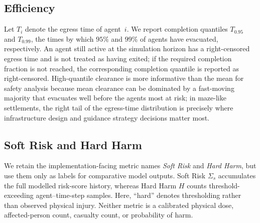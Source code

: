 \documentclass[preprint,12pt]{elsarticle}
\providecommand{\FloatBarrier}{}
\let\origsubsection\subsection
\renewcommand{\subsection}{\FloatBarrier\origsubsection}
\begin{document}
\subsection{Efficiency}
\label{sec:eval_efficiency}

Let $T_i$ denote the egress time of agent~$i$. We report completion
quantiles $T_{0.95}$ and $T_{0.99}$, the times by which $95\%$ and
$99\%$ of agents have evacuated, respectively. An agent still active at
the simulation horizon has a right-censored egress time and is not treated
as having exited; if the required completion fraction is not reached, the
corresponding completion quantile is reported as right-censored. High-quantile clearance is
more informative than the mean for safety analysis because mean
clearance can be dominated by a fast-moving majority that evacuates
well before the agents most at risk; in maze-like settlements, the
right tail of the egress-time distribution is precisely where
infrastructure design and guidance strategy decisions matter most.


\subsection{Soft Risk and Hard Harm}
\label{sec:eval_exposure}

We retain the implementation-facing metric names \emph{Soft Risk} and
\emph{Hard Harm}, but use them only as labels for comparative model
outputs. Soft Risk $\Sigma_s$ accumulates the full modelled risk-score
history, whereas Hard Harm $H$ counts threshold-exceeding agent--time-step
samples. Here, ``hard'' denotes thresholding rather than observed physical
injury. Neither metric is a calibrated physical dose, affected-person
count, casualty count, or probability of harm.
\end{document}
